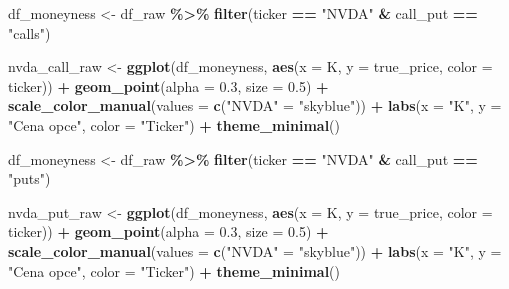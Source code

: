 \documentclass[
]{article}
\newenvironment{Shaded}{\begin{snugshade}}{\end{snugshade}}
\newcommand{\AttributeTok}[1]{\textcolor[rgb]{0.13,0.29,0.53}{#1}}
\newcommand{\FloatTok}[1]{\textcolor[rgb]{0.00,0.00,0.81}{#1}}
\newcommand{\FunctionTok}[1]{\textcolor[rgb]{0.13,0.29,0.53}{\textbf{#1}}}
\newcommand{\NormalTok}[1]{#1}
\newcommand{\OtherTok}[1]{\textcolor[rgb]{0.56,0.35,0.01}{#1}}
\newcommand{\SpecialCharTok}[1]{\textcolor[rgb]{0.81,0.36,0.00}{\textbf{#1}}}
\newcommand{\StringTok}[1]{\textcolor[rgb]{0.31,0.60,0.02}{#1}}
\begin{document}
\begin{Shaded}
\begin{Highlighting}[]
\NormalTok{df\_moneyness }\OtherTok{\textless{}{-}}\NormalTok{ df\_raw }\SpecialCharTok{\%\textgreater{}\%} \FunctionTok{filter}\NormalTok{(ticker }\SpecialCharTok{==} \StringTok{"NVDA"} \SpecialCharTok{\&}\NormalTok{ call\_put }\SpecialCharTok{==} \StringTok{"calls"}\NormalTok{)}

\NormalTok{nvda\_call\_raw }\OtherTok{\textless{}{-}} \FunctionTok{ggplot}\NormalTok{(df\_moneyness, }\FunctionTok{aes}\NormalTok{(}\AttributeTok{x =}\NormalTok{ K, }\AttributeTok{y =}\NormalTok{ true\_price, }\AttributeTok{color =}\NormalTok{ ticker)) }\SpecialCharTok{+}
  \FunctionTok{geom\_point}\NormalTok{(}\AttributeTok{alpha =} \FloatTok{0.3}\NormalTok{, }\AttributeTok{size =} \FloatTok{0.5}\NormalTok{) }\SpecialCharTok{+}
  \FunctionTok{scale\_color\_manual}\NormalTok{(}\AttributeTok{values =} \FunctionTok{c}\NormalTok{(}\StringTok{"NVDA"} \OtherTok{=} \StringTok{"skyblue"}\NormalTok{)) }\SpecialCharTok{+}
  \FunctionTok{labs}\NormalTok{(}\AttributeTok{x =} \StringTok{"K"}\NormalTok{, }\AttributeTok{y =} \StringTok{"Cena opce"}\NormalTok{,}
       \AttributeTok{color =} \StringTok{"Ticker"}\NormalTok{) }\SpecialCharTok{+}
  \FunctionTok{theme\_minimal}\NormalTok{()}
\end{Highlighting}
\end{Shaded}

\begin{Shaded}
\begin{Highlighting}[]
\NormalTok{df\_moneyness }\OtherTok{\textless{}{-}}\NormalTok{ df\_raw }\SpecialCharTok{\%\textgreater{}\%} \FunctionTok{filter}\NormalTok{(ticker }\SpecialCharTok{==} \StringTok{"NVDA"} \SpecialCharTok{\&}\NormalTok{ call\_put }\SpecialCharTok{==} \StringTok{"puts"}\NormalTok{)}

\NormalTok{nvda\_put\_raw }\OtherTok{\textless{}{-}} \FunctionTok{ggplot}\NormalTok{(df\_moneyness, }\FunctionTok{aes}\NormalTok{(}\AttributeTok{x =}\NormalTok{ K, }\AttributeTok{y =}\NormalTok{ true\_price, }\AttributeTok{color =}\NormalTok{ ticker)) }\SpecialCharTok{+}
  \FunctionTok{geom\_point}\NormalTok{(}\AttributeTok{alpha =} \FloatTok{0.3}\NormalTok{, }\AttributeTok{size =} \FloatTok{0.5}\NormalTok{) }\SpecialCharTok{+}
  \FunctionTok{scale\_color\_manual}\NormalTok{(}\AttributeTok{values =} \FunctionTok{c}\NormalTok{(}\StringTok{"NVDA"} \OtherTok{=} \StringTok{"skyblue"}\NormalTok{)) }\SpecialCharTok{+}
  \FunctionTok{labs}\NormalTok{(}\AttributeTok{x =} \StringTok{"K"}\NormalTok{, }\AttributeTok{y =} \StringTok{"Cena opce"}\NormalTok{,}
       \AttributeTok{color =} \StringTok{"Ticker"}\NormalTok{) }\SpecialCharTok{+}
  \FunctionTok{theme\_minimal}\NormalTok{()}
\end{Highlighting}
\end{Shaded}
\end{document}
